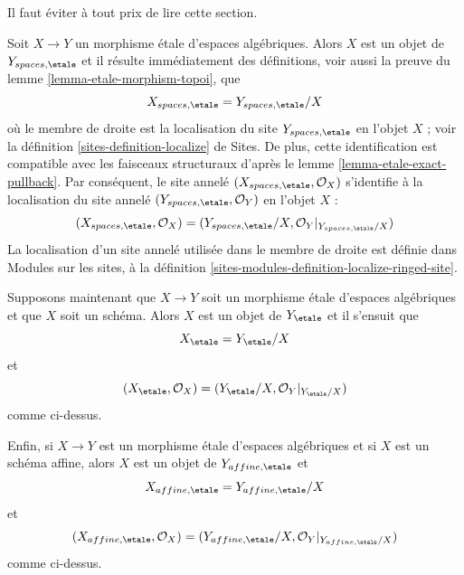 \noindent
Il faut éviter à tout prix de lire cette section.

\medskip\noindent
Soit $X \to Y$ un morphisme \'etale d'espaces algébriques.
Alors $X$ est un objet de $Y_{spaces, \etale}$ et il résulte
immédiatement des définitions, voir aussi la preuve du
lemme \ref{lemma-etale-morphism-topoi},
que
\begin{equation}
\label{equation-localize}
X_{spaces, \etale} = Y_{spaces, \etale}/X
\end{equation}
où le membre de droite est la localisation du site
$Y_{spaces, \etale}$ en l'objet $X$ ; voir la
définition \ref{sites-definition-localize} de Sites.
De plus, cette identification est compatible avec les faisceaux structuraux d'après le
lemme \ref{lemma-etale-exact-pullback}.
Par conséquent, le site annelé $(X_{spaces, \etale}, \mathcal{O}_X)$
s'identifie à la localisation du site annelé
$(Y_{spaces, \etale}, \mathcal{O}_Y)$ en l'objet $X$ :
\begin{equation}
\label{equation-localize-ringed}
(X_{spaces, \etale}, \mathcal{O}_X) =
(Y_{spaces, \etale}/X, \mathcal{O}_Y|_{Y_{spaces, \etale}/X})
\end{equation}
La localisation d'un site annelé utilisée dans le membre de droite est définie dans
Modules sur les sites, à la
définition \ref{sites-modules-definition-localize-ringed-site}.

\medskip\noindent
Supposons maintenant que $X \to Y$ soit un morphisme \'etale d'espaces algébriques et que $X$ soit
un schéma. Alors $X$ est un objet de $Y_\etale$ et il s'ensuit que
\begin{equation}
\label{equation-localize-at-scheme}
X_\etale = Y_\etale/X
\end{equation}
et
\begin{equation}
\label{equation-localize-at-scheme-ringed}
(X_\etale, \mathcal{O}_X) =
(Y_\etale/X, \mathcal{O}_Y|_{Y_\etale/X})
\end{equation}
comme ci-dessus.

\medskip\noindent
Enfin, si $X \to Y$ est un morphisme \'etale d'espaces algébriques et si $X$ est
un schéma affine, alors $X$ est un objet de $Y_{affine, \etale}$ et
\begin{equation}
\label{equation-localize-at-affine}
X_{affine, \etale} = Y_{affine, \etale}/X
\end{equation}
et
\begin{equation}
\label{equation-localize-at-affine-ringed}
(X_{affine, \etale}, \mathcal{O}_X) =
(Y_{affine, \etale}/X, \mathcal{O}_Y|_{Y_{affine, \etale}/X})
\end{equation}
comme ci-dessus.

